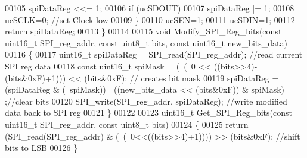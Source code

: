 \begin{DoxyCode}
00105         spiDataReg <<= 1;
00106         \textcolor{keywordflow}{if} (ucSDOUT)
00107             spiDataReg |= 1;
00108         ucSCLK=0;   \textcolor{comment}{//set Clock low}
00109     \}
00110     ucSEN=1;
00111     ucSDIN=1;
00112     \textcolor{keywordflow}{return} spiDataReg;
00113 \}
00114 
00115 \textcolor{keywordtype}{void} Modify_SPI_Reg_bits(\textcolor{keyword}{const} uint16\_t SPI\_reg\_addr, \textcolor{keyword}{const} uint8\_t bits, \textcolor{keyword}{const} uint16\_t new\_bits\_data)
00116 \{
00117     uint16\_t spiDataReg = SPI_read(SPI\_reg\_addr); \textcolor{comment}{//read current SPI reg data}
00118     \textcolor{keyword}{const} uint16\_t spiMask = (~(~0 << ((bits>>4)-(bits&0xF)+1))) << (bits&0xF); \textcolor{comment}{// creates bit mask}
00119     spiDataReg = (spiDataReg & (~spiMask)) | ((new\_bits\_data << (bits&0xF)) & spiMask) ;\textcolor{comment}{//clear bits}
00120     SPI_write(SPI\_reg\_addr, spiDataReg); \textcolor{comment}{//write modified data back to SPI reg}
00121 \}
00122 
00123 uint16\_t Get_SPI_Reg_bits(\textcolor{keyword}{const} uint16\_t SPI\_reg\_addr, \textcolor{keyword}{const} uint8\_t bits)
00124 \{
00125     \textcolor{keywordflow}{return} (SPI_read(SPI\_reg\_addr) & (~(~0<<((bits>>4)+1)))) >> (bits&0xF); \textcolor{comment}{//shift bits to LSB}
00126 \}
\end{DoxyCode}
